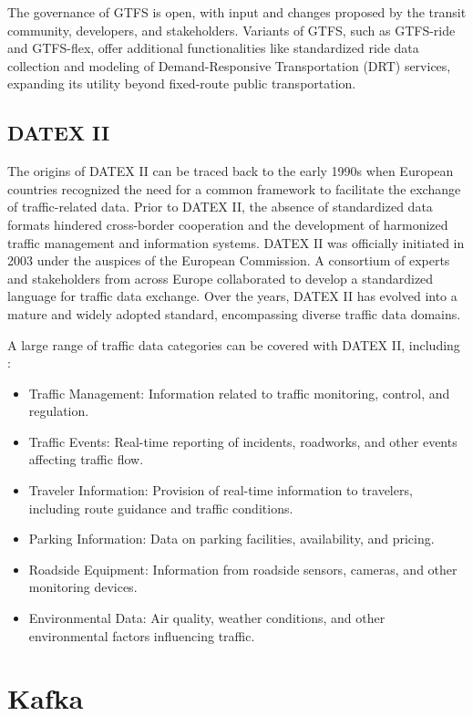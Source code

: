 \documentclass[12pt]{report}
\begin{document}
	The governance of GTFS is open, with input and changes proposed by the transit community, developers, and stakeholders. Variants of GTFS, such as GTFS-ride and GTFS-flex, offer additional functionalities like standardized ride data collection and modeling of Demand-Responsive Transportation (DRT) services, expanding its utility beyond fixed-route public transportation.
	
	
	\subsection{DATEX II}
	
	The origins of DATEX II can be traced back to the early 1990s when European countries recognized the need for a common framework to facilitate the exchange of traffic-related data. Prior to DATEX II, the absence of standardized data formats hindered cross-border cooperation and the development of harmonized traffic management and information systems. DATEX II was officially initiated in 2003 under the auspices of the European Commission. A consortium of experts and stakeholders from across Europe collaborated to develop a standardized language for traffic data exchange. Over the years, DATEX II has evolved into a mature and widely adopted standard, encompassing diverse traffic data domains.
	
	A large range of traffic data categories can  be covered with  DATEX II, including : 
	\begin{itemize}[noitemsep]
		\item    Traffic Management: Information related to traffic monitoring, control, and regulation.
		\item Traffic Events: Real-time reporting of incidents, roadworks, and other events affecting traffic flow.
		\item Traveler Information: Provision of real-time information to travelers, including route guidance and traffic conditions.
		\item Parking Information: Data on parking facilities, availability, and pricing.
		\item Roadside Equipment: Information from roadside sensors, cameras, and other monitoring devices.
		\item Environmental Data: Air quality, weather conditions, and other environmental factors influencing traffic.
		
		
	\end{itemize}
	
	\section{Kafka}
	\label{sec:kafka}
	
\end{document}
